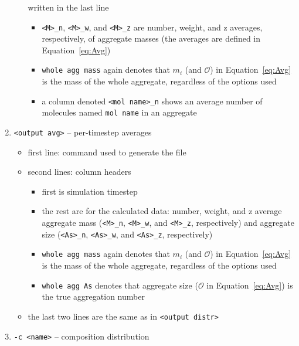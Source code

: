 \begin{enumerate}[nosep,leftmargin=20pt]
\begin{itemize}[nosep,leftmargin=5pt]
        written in the last line
        \begin{itemize}[nosep,leftmargin=10pt]
          \item \texttt{<M>\_n}, \texttt{<M>\_w}, and \texttt{<M>\_z} are
            number, weight, and z averages, respectively, of aggregate
            masses (the averages are defined in Equation~\eqref{eq:Avg})
          \item \texttt{whole agg mass} again denotes that $m_i$ (and
            $\mathcal{O}$) in Equation~\eqref{eq:Avg} is the mass of the
            whole aggregate, regardless of the options used
          \item a column denoted \texttt{<mol name>\_n} shows an average number of
            molecules named \texttt{mol name} in an aggregate
        \end{itemize}
    \end{itemize}
  \item \texttt{<output avg>} -- per-timestep averages
  \begin{itemize}[nosep,leftmargin=5pt]
    \item first line: command used to generate the file
    \item second lines: column headers
      \begin{itemize}[nosep,leftmargin=10pt]
        \item first is simulation timestep
        \item the rest are for the calculated data: number, weight, and z
          average aggregate mass (\texttt{<M>\_n}, \texttt{<M>\_w}, and
          \texttt{<M>\_z}, respectively) and aggregate size
          (\texttt{<As>\_n}, \texttt{<As>\_w}, and \texttt{<As>\_z},
          respectively)
        \item \texttt{whole agg mass} again denotes that $m_i$ (and
          $\mathcal{O}$) in Equation~\eqref{eq:Avg} is the mass of the
          whole aggregate, regardless of the options used
        \item \texttt{whole agg As} denotes that aggregate size
          ($\mathcal{O}$ in Equation~\eqref{eq:Avg}) is the true aggregation
          number
      \end{itemize}
    \item the last two lines are the same as in \texttt{<output distr>}
  \end{itemize}
\item \texttt{-c <name>} -- composition distribution
  \begin{itemize}[nosep,leftmargin=5pt]

\end{itemize}
\end{enumerate}

